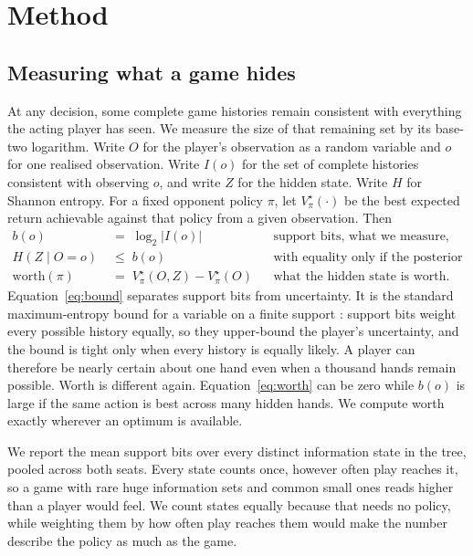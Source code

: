 \documentclass{article}
\begin{document}
\section{Method}
\label{sec:method}

\subsection{Measuring what a game hides}
\label{sec:m-atlas}

At any decision, some complete game histories remain consistent with everything the acting player has seen. We measure the size of that remaining set by its base-two logarithm. Write $O$ for the player's observation as a random variable and $o$ for one realised observation. Write $I(o)$ for the set of complete histories consistent with observing $o$, and write $Z$ for the hidden state. Write $H$ for Shannon entropy. For a fixed opponent policy $\pi$, let $V^\star_\pi(\cdot)$ be the best expected return achievable against that policy from a given observation. Then
%
\begin{align}
  b(o) &\;=\; \log_2 |I(o)| &&\text{support bits, what we measure,}
  \label{eq:bits}\\
  H(Z \mid O = o) &\;\le\; b(o) &&\text{with equality only if the posterior is uniform,}
  \label{eq:bound}\\
  \mathrm{worth}(\pi) &\;=\; V^\star_\pi(O, Z) - V^\star_\pi(O) &&\text{what the hidden state is
  worth.}
  \label{eq:worth}
\end{align}
%
Equation~\eqref{eq:bound} separates support bits from uncertainty. It is the standard maximum-entropy bound for a variable on a finite support \citep{coverthomas}: support bits weight every possible history equally, so they upper-bound the player's uncertainty, and the bound is tight only when every history is equally likely. A player can therefore be nearly certain about one hand even when a thousand hands remain possible. Worth is different again. Equation~\eqref{eq:worth} can be zero while $b(o)$ is large if the same action is best across many hidden hands. We compute worth exactly wherever an optimum is available.

We report the mean support bits over every distinct information state in the tree, pooled across both seats. Every state counts once, however often play reaches it, so a game with rare huge information sets and common small ones reads higher than a player would feel. We count states equally because that needs no policy, while weighting them by how often play reaches them would make the number describe the policy as much as the game.
\end{document}
